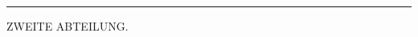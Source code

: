 \begin{center}\rule{0.16\linewidth}{0.4pt}\end{center}
\begin{center}ZWEITE ABTEILUNG.\end{center}

